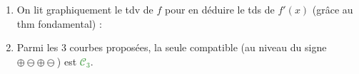 \documentclass[a4paper,11pt]{article}
\begin{document}
\medskip


\begin{enumerate}
	\item On lit graphiquement le tdv de $f$ pour en déduire le tds de $f'(x)$ (grâce au thm fondamental) :
	\begin{center}
	\end{center}
	\item Parmi les 3 courbes proposées, la seule compatible (au niveau du signe $\oplus\ominus\oplus\ominus$) est \textcolor{ForestGreen}{$\mathscr{C}_3$}.
\end{enumerate}

\medskip


\end{document}
